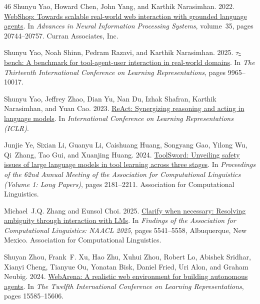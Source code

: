 \documentclass[11pt]{article}
\begin{document}
\begin{thebibliography}{46}
Shunyu Yao, Howard Chen, John Yang, and Karthik Narasimhan. 2022.
\newblock \href {https://doi.org/10.52202/068431-1508} {{WebShop}: Towards scalable real-world web interaction with grounded language agents}.
\newblock In \emph{Advances in Neural Information Processing Systems}, volume~35, pages 20744--20757. Curran Associates, Inc.

Shunyu Yao, Noah Shinn, Pedram Razavi, and Karthik Narasimhan. 2025.
\newblock \href {https://proceedings.iclr.cc/paper_files/paper/2025/hash/1b126cc38b8638e07bef37e7b2bb72bf-Abstract-Conference.html} {{$\tau$}-bench: A benchmark for tool-agent-user interaction in real-world domains}.
\newblock In \emph{The Thirteenth International Conference on Learning Representations}, pages 9965--10017.

Shunyu Yao, Jeffrey Zhao, Dian Yu, Nan Du, Izhak Shafran, Karthik Narasimhan, and Yuan Cao. 2023.
\newblock \href {https://react-lm.github.io/} {{ReAct}: Synergizing reasoning and acting in language models}.
\newblock In \emph{International Conference on Learning Representations (ICLR)}.

Junjie Ye, Sixian Li, Guanyu Li, Caishuang Huang, Songyang Gao, Yilong Wu, Qi~Zhang, Tao Gui, and Xuanjing Huang. 2024.
\newblock \href {https://doi.org/10.18653/v1/2024.acl-long.119} {{ToolSword}: Unveiling safety issues of large language models in tool learning across three stages}.
\newblock In \emph{Proceedings of the 62nd Annual Meeting of the Association for Computational Linguistics (Volume 1: Long Papers)}, pages 2181--2211. Association for Computational Linguistics.

Michael~J.Q. Zhang and Eunsol Choi. 2025.
\newblock \href {https://doi.org/10.18653/v1/2025.findings-naacl.306} {Clarify when necessary: Resolving ambiguity through interaction with {LM}s}.
\newblock In \emph{Findings of the Association for Computational Linguistics: NAACL 2025}, pages 5541--5558, Albuquerque, New Mexico. Association for Computational Linguistics.

Shuyan Zhou, Frank~F. Xu, Hao Zhu, Xuhui Zhou, Robert Lo, Abishek Sridhar, Xianyi Cheng, Tianyue Ou, Yonatan Bisk, Daniel Fried, Uri Alon, and Graham Neubig. 2024.
\newblock \href {https://proceedings.iclr.cc/paper_files/paper/2024/hash/4410c0711e9154a7a2d26f9b3816d1ef-Abstract-Conference.html} {{WebArena}: A realistic web environment for building autonomous agents}.
\newblock In \emph{The Twelfth International Conference on Learning Representations}, pages 15585--15606.


\end{thebibliography}
\end{document}
